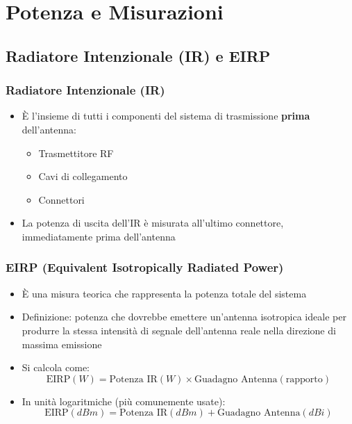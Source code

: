 \section{Potenza e Misurazioni}

\subsection{Radiatore Intenzionale (IR) e EIRP}

\subsubsection{Radiatore Intenzionale (IR)}
\begin{itemize}
    \item È l'insieme di tutti i componenti del sistema di trasmissione \textbf{prima} dell'antenna:
    \begin{itemize}
        \item Trasmettitore RF
        \item Cavi di collegamento
        \item Connettori
    \end{itemize}
    \item La potenza di uscita dell'IR è misurata all'ultimo connettore, immediatamente prima dell'antenna
\end{itemize}

\subsubsection{EIRP (Equivalent Isotropically Radiated Power)}
\begin{itemize}
    \item È una misura teorica che rappresenta la potenza totale del sistema
    \item Definizione: potenza che dovrebbe emettere un'antenna isotropica ideale per produrre la stessa intensità di segnale dell'antenna reale nella direzione di massima emissione
    \item Si calcola come:
    \[ \text{EIRP} (W) = \text{Potenza IR} (W) \times \text{Guadagno Antenna} (\text{rapporto}) \]
    \item In unità logaritmiche (più comunemente usate):
    \[ \text{EIRP} (dBm) = \text{Potenza IR} (dBm) + \text{Guadagno Antenna} (dBi) \]
\end{itemize}

